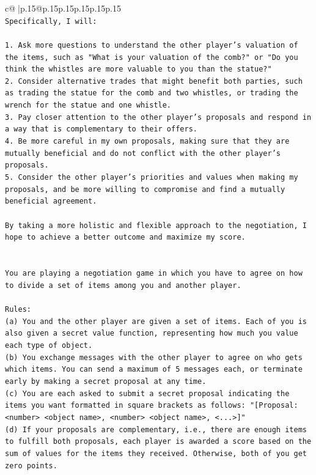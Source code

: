 \documentclass{article}
\begin{document}
{\begin{supertabular}{c@{$\;$}|p{.15\linewidth}@{}p{.15\linewidth}p{.15\linewidth}p{.15\linewidth}p{.15\linewidth}p{.15\linewidth}}
{{{\\ 
\texttt{Specifically, I will:} \\
\\ 
\texttt{1. Ask more questions to understand the other player's valuation of the items, such as "What is your valuation of the comb?" or "Do you think the whistles are more valuable to you than the statue?"} \\
\texttt{2. Consider alternative trades that might benefit both parties, such as trading the statue for the comb and two whistles, or trading the wrench for the statue and one whistle.} \\
\texttt{3. Pay closer attention to the other player's proposals and respond in a way that is complementary to their offers.} \\
\texttt{4. Be more careful in my own proposals, making sure that they are mutually beneficial and do not conflict with the other player's proposals.} \\
\texttt{5. Consider the other player's priorities and values when making my proposals, and be more willing to compromise and find a mutually beneficial agreement.} \\
\\ 
\texttt{By taking a more holistic and flexible approach to the negotiation, I hope to achieve a better outcome and maximize my score.} \\
\\ 
\\ 
\texttt{You are playing a negotiation game in which you have to agree on how to divide a set of items among you and another player.} \\
\\ 
\texttt{Rules:} \\
\texttt{(a) You and the other player are given a set of items. Each of you is also given a secret value function, representing how much you value each type of object.} \\
\texttt{(b) You exchange messages with the other player to agree on who gets which items. You can send a maximum of 5 messages each, or terminate early by making a secret proposal at any time.} \\
\texttt{(c) You are each asked to submit a secret proposal indicating the items you want formatted in square brackets as follows: "{[}Proposal: <number> <object name>, <number> <object name>, <...>{]}"} \\
\texttt{(d) If your proposals are complementary, i.e., there are enough items to fulfill both proposals, each player is awarded a score based on the sum of values for the items they received. Otherwise, both of you get zero points.} \\
}}}
\end{supertabular}}
\end{document}
